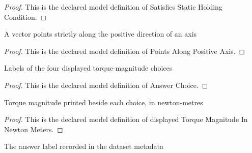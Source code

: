 \begin{proof}
  This is the declared model definition of Satisfies Static Holding Condition.
\end{proof}
\begin{definition}
  \label{def:physics:phyx-mini-0947:phyxminiproblems-problemphyxmini0947-pointsalongpositiveaxis}
  A vector points strictly along the positive direction of an axis
\end{definition}
\begin{proof}
  This is the declared model definition of Points Along Positive Axis.
\end{proof}
\begin{definition}
  \label{def:physics:phyx-mini-0947:phyxminiproblems-problemphyxmini0947-answerchoice}
  Labels of the four displayed torque-magnitude choices
\end{definition}
\begin{proof}
  This is the declared model definition of Answer Choice.
\end{proof}
\begin{definition}
  \label{def:physics:phyx-mini-0947:phyxminiproblems-problemphyxmini0947-displayedtorquemagnitudeinnewtonmeters}
  Torque magnitude printed beside each choice, in newton-metres
\end{definition}
\begin{proof}
  This is the declared model definition of displayed Torque Magnitude In Newton Meters.
\end{proof}
\begin{definition}
  \label{def:physics:phyx-mini-0947:phyxminiproblems-problemphyxmini0947-recordedanswerchoice}
  The answer label recorded in the dataset metadata
\end{definition}
